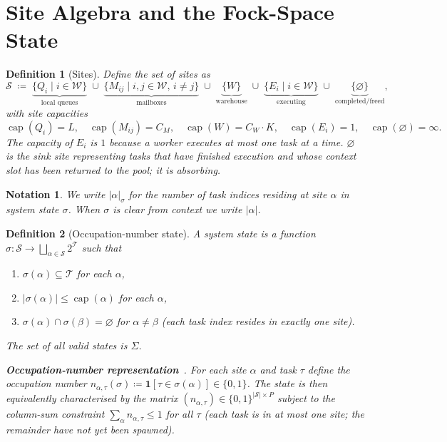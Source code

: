 \documentclass[11pt,a4paper]{article}
\newtheorem{definition}{Definition}[section]
\newtheorem{notation}{Notation}[section]
\begin{document}
\section{Site Algebra and the Fock-Space State}

\begin{definition}[Sites]
\label{def:sites}
Define the set of \emph{sites} as
\[
  \mathcal{S} \;\coloneqq\;
  \underbrace{\{Q_i \mid i \in \mathcal{W}\}}_{\text{local queues}}
  \;\cup\;
  \underbrace{\{M_{ij} \mid i,j \in \mathcal{W},\, i \neq j\}}_{\text{mailboxes}}
  \;\cup\;
  \underbrace{\{W\}}_{\text{warehouse}}
  \;\cup\;
  \underbrace{\{E_i \mid i \in \mathcal{W}\}}_{\text{executing}}
  \;\cup\;
  \underbrace{\{\varnothing\}}_{\text{completed/freed}},
\]
with site capacities
\[
  \operatorname{cap}(Q_i) = L,\quad
  \operatorname{cap}(M_{ij}) = C_M,\quad
  \operatorname{cap}(W) = C_W \cdot K,\quad
  \operatorname{cap}(E_i) = 1,\quad
  \operatorname{cap}(\varnothing) = \infty.
\]
The capacity of $E_i$ is $1$ because a worker executes at most one
task at a time.  $\varnothing$ is the \emph{sink} site representing
tasks that have finished execution and whose context slot has been
returned to the pool; it is absorbing.
\end{definition}

\begin{notation}
We write $|\alpha|_\sigma$ for the number of task indices residing at
site $\alpha$ in system state $\sigma$.  When $\sigma$ is clear from
context we write $|\alpha|$.
\end{notation}

\begin{definition}[Occupation-number state]
\label{def:state}
A \emph{system state} is a function
$\sigma : \mathcal{S} \to \bigsqcup_{\alpha \in \mathcal{S}} 2^{\mathcal{T}}$
such that
\begin{enumerate}
  \item $\sigma(\alpha) \subseteq \mathcal{T}$ for each $\alpha$,
  \item $|\sigma(\alpha)| \leq \operatorname{cap}(\alpha)$ for each $\alpha$,
  \item $\sigma(\alpha) \cap \sigma(\beta) = \varnothing$ for $\alpha \neq \beta$
        (each task index resides in \emph{exactly one} site).
\end{enumerate}
The set of all valid states is $\Sigma$.

\medskip\noindent
\textbf{Occupation-number representation}~\cite{fock1932,landau_qm}.
For each site $\alpha$ and task $\tau$ define the occupation number
$n_{\alpha,\tau}(\sigma) \coloneqq \mathbf{1}[\tau \in \sigma(\alpha)]
\in \{0,1\}$.
The state is then equivalently characterised by the matrix
$(n_{\alpha,\tau}) \in \{0,1\}^{|\mathcal{S}|\times P}$ subject to
the column-sum constraint $\sum_{\alpha} n_{\alpha,\tau} \leq 1$ for
all $\tau$ (each task is in at most one site; the remainder have not
yet been spawned).
\end{definition}
\end{document}
